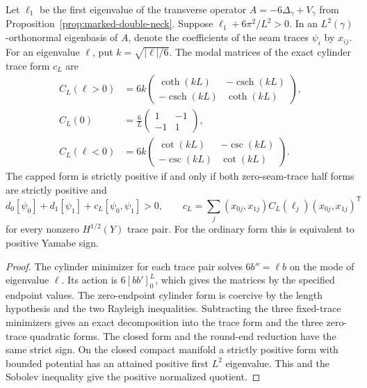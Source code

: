\begin{proposition}\label{prop:short-seam-trace}
Let \(\ell_1\) be the first eigenvalue of the transverse operator
\(A=-6\Delta_\gamma+V_\gamma\) from
Proposition~\ref{prop:marked-double-neck}. Suppose
\(\ell_1+6\pi^2/L^2>0\). In an \(L^2(\gamma)\)-orthonormal
eigenbasis of \(A\), denote the coefficients of the seam traces
\(\psi_i\) by \(x_{ij}\). For an eigenvalue \(\ell\), put
\(k=\sqrt{|\ell|/6}\). The modal matrices of the exact cylinder
trace form \(c_L\) are
\[
 \begin{aligned}
 C_L(\ell>0)&=6k
 \begin{pmatrix}\coth(kL)&-\operatorname{csch}(kL)\\
                 -\operatorname{csch}(kL)&\coth(kL)\end{pmatrix},\\
 C_L(0)&=\tfrac6L\begin{pmatrix}1&-1\\-1&1\end{pmatrix},\\
 C_L(\ell<0)&=6k
 \begin{pmatrix}\cot(kL)&-\csc(kL)\\-\csc(kL)&\cot(kL)\end{pmatrix}.
 \end{aligned}
\]
The capped form is strictly positive if and only if both
zero-seam-trace half forms are strictly positive and
\[
 d_0[\psi_0]+d_1[\psi_1]
 +c_L[\psi_0,\psi_1]>0,\qquad
 c_L=\sum_j (x_{0j},x_{1j}) C_L(\ell_j)(x_{0j},x_{1j})^{\mathsf T}
\]
for every nonzero \(H^{1/2}(Y)\) trace pair. For the ordinary
form this is equivalent to positive Yamabe sign.
\end{proposition}

\begin{proof}
The cylinder minimizer for each trace pair solves
\(6b''=\ell b\) on the mode of eigenvalue \(\ell\). Its action
is \(6[b b']_0^L\), which gives the matrices by the specified
endpoint values. The zero-endpoint cylinder form is coercive
by the length hypothesis and the two Rayleigh inequalities.
Subtracting the three fixed-trace minimizers gives an exact
decomposition into the trace form and the three zero-trace
quadratic forms. The closed form and the round-end reduction
have the same strict sign. On the closed compact manifold a
strictly positive form with bounded potential has an attained
positive first \(L^2\) eigenvalue. This and the Sobolev inequality
give the positive normalized quotient.
\end{proof}

